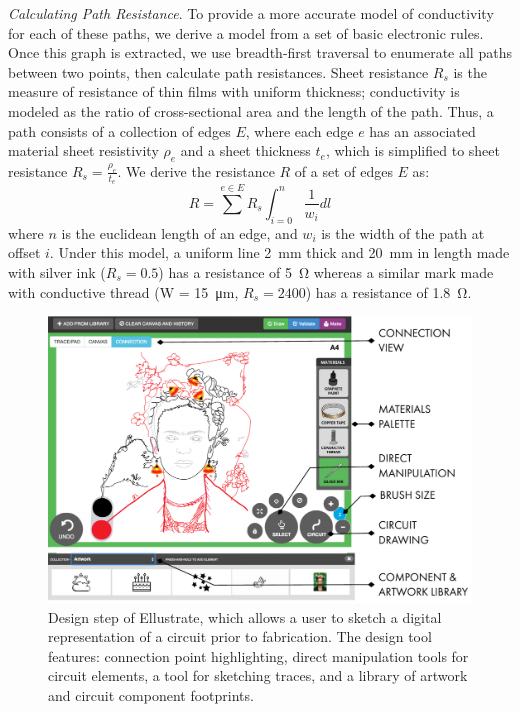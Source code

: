 \documentclass{sigchi}
\begin{document}
      
    \textit{Calculating Path Resistance}. To provide a more accurate model of conductivity for each of these paths, we derive a model from a set of basic electronic rules. Once this graph is extracted, we use breadth-first traversal to enumerate all paths between two points, then calculate path resistances. Sheet resistance $R_s$ is the measure of resistance of thin films with uniform thickness; conductivity is modeled as the ratio of cross-sectional area and the length of the path. Thus, a path consists of a collection of edges $E$, where each edge $e$ has an associated material sheet resistivity $\rho_e$ and a sheet thickness $t_e$, which is simplified to sheet resistance $R_s = \frac{\rho_e}{t_e}$. We derive the resistance $R$ of a set of edges $E$ as:
        \begin{equation}
            R =  \sum^{e \in E} R_s \int_{i=0}^{n}  \frac{1}{w_i} dl
        \label{eq:resistance}
        \end{equation}
      where $n$ is the euclidean length of an edge, and $w_i$ is the width of the path at offset $i$. Under this model, a uniform line \SI{2}{\milli\metre} thick and \SI{20}{\milli\metre} in length made with silver ink ($R_s = 0.5$) has a resistance of \SI{5}{\ohm} whereas a similar mark made with conductive thread (W = \SI{15}{\micro\metre}, $R_s = 2400$) has a resistance of \SI{1.8}{\ohm}.

    \begin{figure}[t]
    \centering
    \includegraphics[width=1.0\columnwidth]{figures/designtool.pdf}
    \caption{Design step of Ellustrate, which allows a user to sketch a digital representation of a circuit prior to fabrication. The design tool features: connection point highlighting, direct manipulation tools for circuit elements, a tool for sketching traces, and a library of artwork and circuit component footprints.}
    \label{fig:design_tool}
    \vspace{-16pt}
    \end{figure}
    
\end{document}

